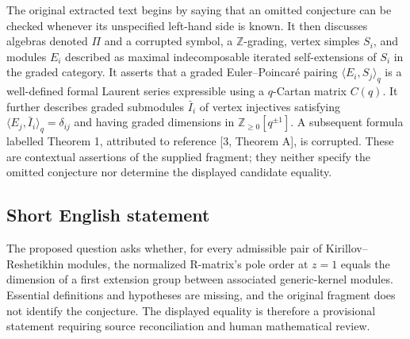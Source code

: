 \documentclass[11pt]{article}
\begin{document}
The original extracted text begins by saying that an omitted conjecture can be checked whenever its unspecified left-hand side is known. It then discusses algebras denoted \(\Pi\) and a corrupted symbol, a \(\mathbb Z\)-grading, vertex simples \(S_i\), and modules \(E_i\) described as maximal indecomposable iterated self-extensions of \(S_i\) in the graded category. It asserts that a graded Euler--Poincar\'e pairing \(\langle E_i,S_j\rangle_q\) is a well-defined formal Laurent series expressible using a \(q\)-Cartan matrix \(C(q)\). It further describes graded submodules \(\bar I_i\) of vertex injectives satisfying \(\langle E_j,\bar I_i\rangle_q=\delta_{ij}\) and having graded dimensions in \(\mathbb Z_{\geq0}[q^{\pm1}]\). A subsequent formula labelled Theorem 1, attributed to reference [3, Theorem A], is corrupted. These are contextual assertions of the supplied fragment; they neither specify the omitted conjecture nor determine the displayed candidate equality.
\subsection{Short English statement}
The proposed question asks whether, for every admissible pair of Kirillov--Reshetikhin modules, the normalized R-matrix's pole order at \(z=1\) equals the dimension of a first extension group between associated generic-kernel modules. Essential definitions and hypotheses are missing, and the original fragment does not identify the conjecture. The displayed equality is therefore a provisional statement requiring source reconciliation and human mathematical review.
\end{document}
